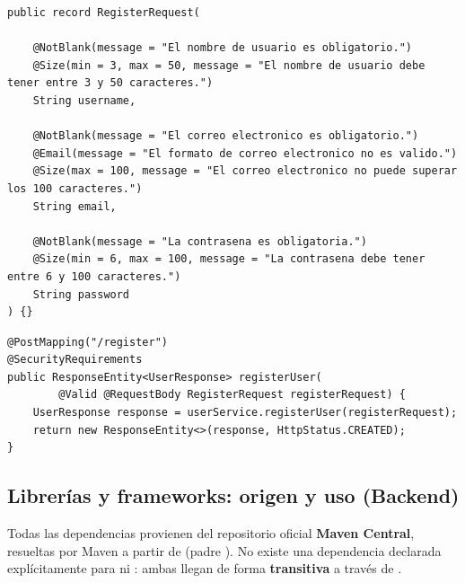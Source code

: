 \documentclass[11pt,a4paper]{article}
\begin{document}
\begin{lstlisting}[style=javastyle,caption={DTO de registro con validación declarativa (RegisterRequest.java)}]
public record RegisterRequest(

    @NotBlank(message = "El nombre de usuario es obligatorio.")
    @Size(min = 3, max = 50, message = "El nombre de usuario debe tener entre 3 y 50 caracteres.")
    String username,

    @NotBlank(message = "El correo electronico es obligatorio.")
    @Email(message = "El formato de correo electronico no es valido.")
    @Size(max = 100, message = "El correo electronico no puede superar los 100 caracteres.")
    String email,

    @NotBlank(message = "La contrasena es obligatoria.")
    @Size(min = 6, max = 100, message = "La contrasena debe tener entre 6 y 100 caracteres.")
    String password
) {}
\end{lstlisting}

\begin{lstlisting}[style=javastyle,caption={Activación de la validación en el controlador (UserController.java)}]
@PostMapping("/register")
@SecurityRequirements
public ResponseEntity<UserResponse> registerUser(
        @Valid @RequestBody RegisterRequest registerRequest) {
    UserResponse response = userService.registerUser(registerRequest);
    return new ResponseEntity<>(response, HttpStatus.CREATED);
}
\end{lstlisting}

\subsection{Librerías y frameworks: origen y uso (Backend)}

Todas las dependencias provienen del repositorio oficial \textbf{Maven Central}, resueltas por Maven a partir de \texttt{} (padre \texttt{}). No existe una dependencia declarada explícitamente para \texttt{} ni \texttt{}: ambas llegan de forma \textbf{transitiva} a través de \texttt{}.
\end{document}
